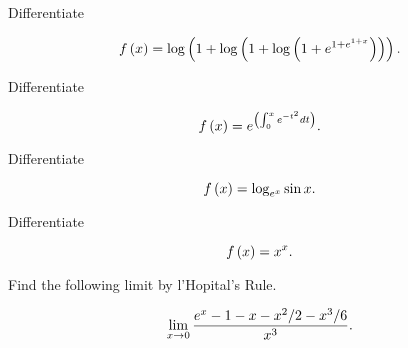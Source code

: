 \documentclass[12pt,letterpaper]{hmcpset}
\newcommand{\pn}[1]{\left( #1 \right)}
\newcommand{\fx}{f \left( x \right) =}
\begin{document}

\begin{problem}[18.1.ii]

    Differentiate

    \[
        \fx \log\pn{ 1 + \log\pn{1 + \log\pn{1 + e^{1 + e^{1+x}}}} }.\\
    \]

\end{problem}

\begin{solution}

\end{solution}

\begin{problem}[18.1.iv]

    Differentiate

    \[
        \fx e^{\pn{\int_0^x e^{-t^2}dt}}.\\
    \]

\end{problem}

\begin{solution}

\end{solution}

\begin{problem}[18.1.vi]

    Differentiate

    \[
        \fx \log_{e^x}\sin x.\\
    \]

\end{problem}

\begin{solution}

\end{solution}

\begin{problem}[18.1.x]

    Differentiate

    \[
        \fx x^x.\\
    \]

\end{problem}

\begin{solution}

\end{solution}

\begin{problem}[18.5.ii]

    Find the following limit by l'Hopital's Rule.

    \[
        \lim_{x\to 0}\frac{e^x - 1 - x - x^2/2 - x^3/6}{x^3}.\\
    \]

\end{problem}
\end{document}
